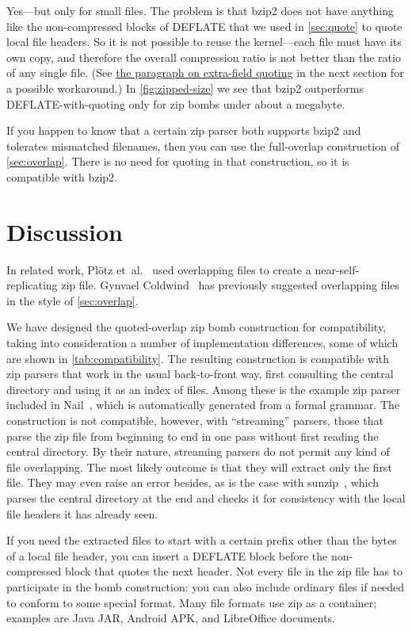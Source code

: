 \documentclass[letterpaper,twocolumn,10pt]{article}
\begin{document}
Yes---but only for small files.
The problem is that bzip2 does not have anything like the
non-compressed blocks of DEFLATE
that we used in \autoref{sec:quote} to quote local file headers.
So it is not possible to reuse the kernel---each file must have
its own copy, and therefore the overall compression ratio
is not better than the ratio of any single file.
(See \hyperref[para:extra]{the paragraph on extra-field quoting}
in the next section for a possible workaround.)
In \autoref{fig:zipped-size} we see that
bzip2 outperforms DEFLATE-with-quoting
only for zip bombs under about a megabyte.

If you happen to know that a certain zip parser both supports bzip2
and tolerates mismatched filenames,
then you can use the full-overlap construction of \autoref{sec:overlap}.
There is no need for quoting in that construction,
so it is compatible with bzip2.


\section{Discussion}
\label{sec:discussion}

In related work,
Plötz et~al.~\cite[\S 4]{SAR-PR-2006-04}
used overlapping files to create a
near-self-replicating zip file.
Gynvael Coldwind~\cite[p47]{gynvael}
has previously suggested
overlapping files in the style of \autoref{sec:overlap}.

We have designed the quoted-overlap zip bomb construction for compatibility,
taking into consideration a number of implementation differences,
some of which are shown in \autoref{tab:compatibility}.
The resulting construction is compatible with zip parsers that work
in the usual back-to-front way,
first consulting the central directory
and using it as an index of files.
Among these is the example
zip parser included in Nail~\cite{186219},
which is automatically generated from a formal grammar.
The construction is not compatible, however,
with ``streaming'' parsers,
those that parse the zip file from beginning to end in one pass
without first reading the central directory.
By their nature, streaming parsers
do not permit any kind of file overlapping.
The most likely outcome is that they
will extract only the first file.
They may even raise an error besides,
as is the case with \mbox{sunzip}~\cite{sunzip},
which parses the central directory at the end and checks it for consistency
with the local file headers it has already seen.

If you need the extracted files to start with a certain prefix
other than the bytes of a local file header,
you can insert a DEFLATE block before the
non-compressed block that quotes the next header.
Not every file in the zip file has to participate in the bomb construction:
you can also include ordinary files
if needed to conform to some special format.
Many file formats use zip as a container;
examples are Java JAR, Android APK, and LibreOffice documents.
\end{document}
